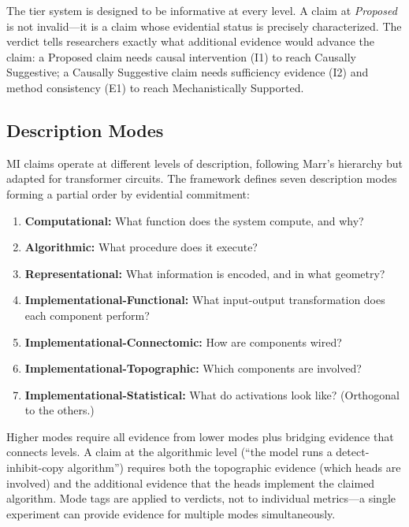 \documentclass[10pt]{article}
\begin{document}
The tier system is designed to be informative at every level. A claim at \emph{Proposed} is not invalid---it is a claim whose evidential status is precisely characterized. The verdict tells researchers exactly what additional evidence would advance the claim: a Proposed claim needs causal intervention (I1) to reach Causally Suggestive; a Causally Suggestive claim needs sufficiency evidence (I2) and method consistency (E1) to reach Mechanistically Supported.

\subsection{Description Modes}
\label{sec:description-modes}

MI claims operate at different levels of description, following Marr's hierarchy but adapted for transformer circuits. The framework defines seven description modes forming a partial order by evidential commitment:

\begin{enumerate}[nosep]
    \item \textbf{Computational:} What function does the system compute, and why?
    \item \textbf{Algorithmic:} What procedure does it execute?
    \item \textbf{Representational:} What information is encoded, and in what geometry?
    \item \textbf{Implementational-Functional:} What input-output transformation does each component perform?
    \item \textbf{Implementational-Connectomic:} How are components wired?
    \item \textbf{Implementational-Topographic:} Which components are involved?
    \item \textbf{Implementational-Statistical:} What do activations look like? (Orthogonal to the others.)
\end{enumerate}

Higher modes require all evidence from lower modes plus bridging evidence that connects levels. A claim at the algorithmic level (``the model runs a detect-inhibit-copy algorithm'') requires both the topographic evidence (which heads are involved) and the additional evidence that the heads implement the claimed algorithm. Mode tags are applied to verdicts, not to individual metrics---a single experiment can provide evidence for multiple modes simultaneously.

\end{document}
